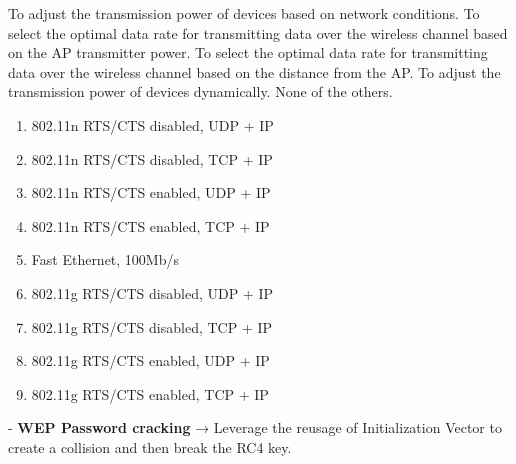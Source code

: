 \begin{questions}




    \begin{checkboxes}
        \choice To adjust the transmission power of devices based on network conditions.
        \choice To select the optimal data rate for transmitting data over the wireless channel based on the AP transmitter power.
        \choice To select the optimal data rate for transmitting data over the wireless channel based on the distance from the AP.
        \choice To adjust the transmission power of devices dynamically.
        \CorrectChoice None of the others.
    \end{checkboxes}

    \begin{solution}
        \begin{enumerate}
            \item 802.11n RTS/CTS disabled, UDP + IP
            \item 802.11n RTS/CTS disabled, TCP + IP
            \item 802.11n RTS/CTS enabled, UDP + IP
            \item 802.11n RTS/CTS enabled, TCP + IP
            \item Fast Ethernet, 100Mb/s
            \item 802.11g RTS/CTS disabled, UDP + IP
            \item 802.11g RTS/CTS disabled, TCP + IP
            \item 802.11g RTS/CTS enabled, UDP + IP
            \item 802.11g RTS/CTS enabled, TCP + IP
        \end{enumerate}
    \end{solution}


    \begin{solution}
        - \textbf{WEP Password cracking} → Leverage the reusage of Initialization Vector to create a collision and then break the RC4 key.


\end{solution}
\end{questions}
